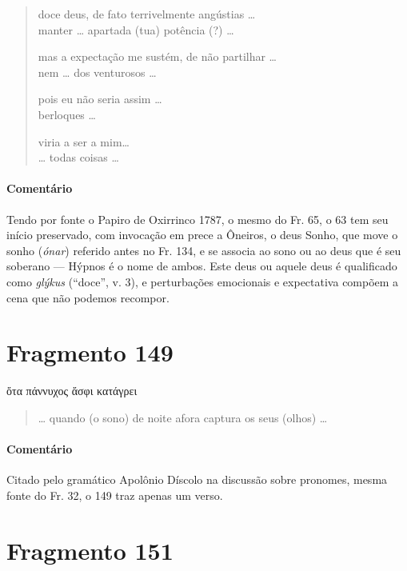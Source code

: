{\begin{verse}
doce deus, de fato terrivelmente angústias \ldots{}\\
manter \ldots{} apartada (tua) potência (?) \ldots{}

mas a expectação me sustém, de não partilhar \ldots{}\\
nem \ldots{}  dos venturosos \ldots{}

pois eu não seria assim \ldots{}\\
berloques \ldots{}

viria a ser a mim\ldots{}\\
\ldots{} todas coisas \ldots{}
\end{verse}

{\paragraph{Comentário} Tendo por fonte o Papiro de Oxirrinco 1787, o mesmo do Fr. 65, o 63 tem seu início preservado, com invocação em prece a Ôneiros, o deus Sonho, que move o sonho (\textit{ónar}) referido antes no Fr. 134, e se associa ao sono ou ao deus que é seu soberano --- Hýpnos é o nome de ambos. Este deus ou aquele deus é qualificado como \textit{glýkus} (``doce'', v. 3), e perturbações emocionais e expectativa compõem a cena que não podemos recompor.}



\pagebreak
\section{Fragmento 149}

\begin{gkverse}
ὄτα πάννυχος ἄσφι κατάγρει
\end{gkverse}

\begin{verse}
\ldots{} quando (o sono) de noite afora captura os seus (olhos) \ldots{}
\end{verse}

{\paragraph{Comentário} Citado pelo gramático Apolônio Díscolo na discussão sobre pronomes, mesma fonte do Fr. 32, o 149 traz apenas um verso.}


\section{Fragmento 151}

}
